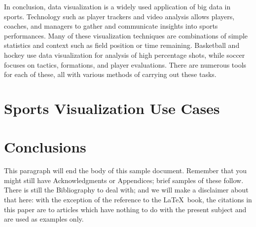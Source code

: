 \documentclass[sigconf]{acmart}
\begin{document}
In conclusion, data visualization is a widely used application of big data in sports. Technology such as player trackers and video analysis allows players, coaches, and managers to gather and communicate insights into sports performances. Many of these visualization techniques are combinations of simple statistics and context such as field position or time remaining. Basketball and hockey use data visualization for analysis of high percentage shots, while soccer focuses on tactics, formations, and player evaluations. There are numerous tools for each of these, all with various methods of carrying out these tasks.
	


\section{Sports Visualization Use Cases}


\section{Conclusions}

This paragraph will end the body of this sample document.  Remember
that you might still have Acknowledgments or Appendices; brief samples
of these follow.  There is still the Bibliography to deal with; and we
will make a disclaimer about that here: with the exception of the
reference to the \LaTeX\ book, the citations in this paper are to
articles which have nothing to do with the present subject and are
used as examples only.
\end{document}
